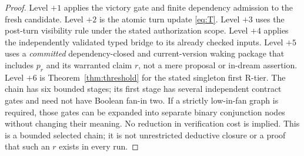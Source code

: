 \documentclass[11pt,letterpaper]{article}
\begin{document}
\begin{proof}
Level $+1$ applies the victory gate and finite dependency admission to the fresh candidate. Level $+2$ is the atomic turn update \eqref{eq:T}. Level $+3$ uses the post-turn visibility rule under the stated authorization scope. Level $+4$ applies the independently validated typed bridge to its already checked inputs. Level $+5$ uses a \emph{committed} dependency-closed and current-version waking package that includes $p_r$ and its warranted claim $r$, not a mere proposal or in-dream assertion. Level $+6$ is Theorem~\ref{thm:threshold} for the stated singleton first R-tier. The chain has six bounded stages; its first stage has several independent contract gates and need not have Boolean fan-in two. If a strictly low-in-fan graph is required, those gates can be expanded into separate binary conjunction nodes without changing their meaning. No reduction in verification cost is implied. This is a bounded selected chain; it is not unrestricted deductive closure or a proof that such an $r$ exists in every run.
\end{proof}
\end{document}
